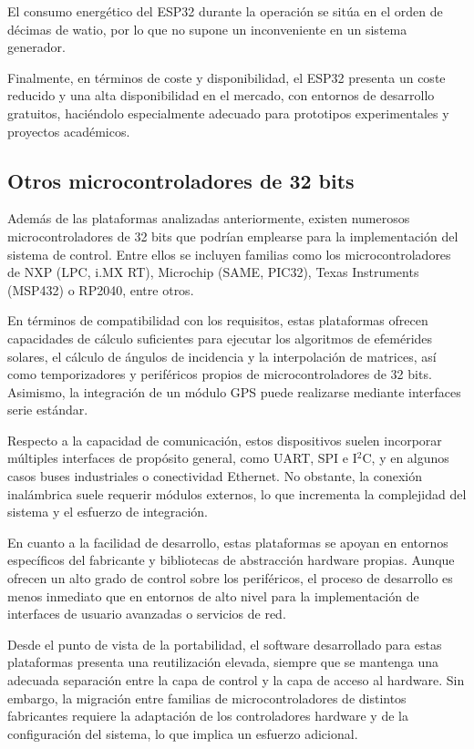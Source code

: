 El consumo energético del ESP32 durante la operación se sitúa en el orden de décimas de watio, por lo que no supone un inconveniente en un sistema generador.

Finalmente, en términos de coste y disponibilidad, el ESP32 presenta un coste reducido y una alta disponibilidad en el mercado, con entornos de desarrollo gratuitos, haciéndolo especialmente adecuado para prototipos experimentales y proyectos académicos.


\subsection{Otros microcontroladores de 32 bits}

Además de las plataformas analizadas anteriormente, existen numerosos microcontroladores de 32 bits que podrían emplearse para la implementación del sistema de control. Entre ellos se incluyen familias como los microcontroladores de NXP (LPC, i.MX RT), Microchip (SAME, PIC32), Texas Instruments (MSP432) o RP2040, entre otros.

En términos de compatibilidad con los requisitos, estas plataformas ofrecen capacidades de cálculo suficientes para ejecutar los algoritmos de efemérides solares, el cálculo de ángulos de incidencia y la interpolación de matrices, así como temporizadores y periféricos propios de microcontroladores de 32 bits. Asimismo, la integración de un módulo GPS puede realizarse mediante interfaces serie estándar.

Respecto a la capacidad de comunicación, estos dispositivos suelen incorporar múltiples interfaces de propósito general, como UART, SPI e I$^2$C, y en algunos casos buses industriales o conectividad Ethernet. No obstante, la conexión inalámbrica suele requerir módulos externos, lo que incrementa la complejidad del sistema y el esfuerzo de integración.

En cuanto a la facilidad de desarrollo, estas plataformas se apoyan en entornos específicos del fabricante y bibliotecas de abstracción hardware propias. Aunque ofrecen un alto grado de control sobre los periféricos, el proceso de desarrollo es menos inmediato que en entornos de alto nivel para la implementación de interfaces de usuario avanzadas o servicios de red.

Desde el punto de vista de la portabilidad, el software desarrollado para estas plataformas presenta una reutilización elevada, siempre que se mantenga una adecuada separación entre la capa de control y la capa de acceso al hardware. Sin embargo, la migración entre familias de microcontroladores de distintos fabricantes requiere la adaptación de los controladores hardware y de la configuración del sistema, lo que implica un esfuerzo adicional.

